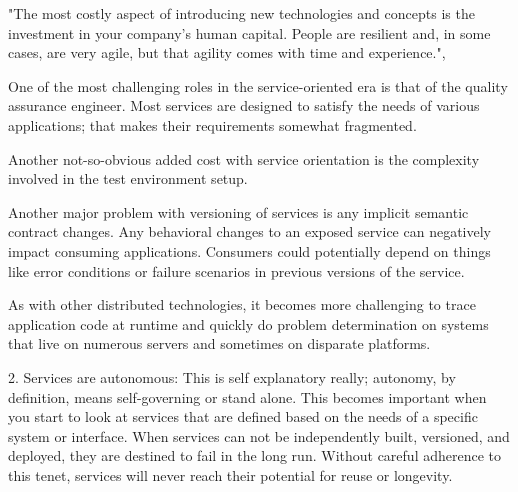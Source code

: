 \documentclass[12pt]{article}
\begin{document}
"The most costly aspect of introducing new technologies and concepts is the investment in your company’s human capital. People are resilient and, in some cases, are very agile, but that agility comes with time and experience.",\cite{pcsoa}

One of the most challenging roles in the service-oriented era is that of the quality assurance engineer. Most services are designed to satisfy the needs of various applications; that makes their requirements somewhat fragmented.

Another not-so-obvious added cost with service orientation is the complexity involved in the test environment setup.


Another major problem with versioning of services is any implicit semantic contract changes. Any behavioral changes to an exposed service can negatively impact consuming applications. 
Consumers could potentially depend on things like error conditions or failure scenarios in previous versions of the service. 


As with other distributed technologies, it becomes more challenging to trace application code at runtime and quickly do problem determination on systems that live on numerous servers and sometimes on disparate platforms.






2.      Services are autonomous: This is self explanatory really; autonomy, by definition, means self-governing or stand alone. This becomes important when you start to look at services that are defined based on the needs of a specific system or interface. When services can not be independently built, versioned, and deployed, they are destined to fail in the long run. Without careful adherence to this tenet, services will never reach their potential for reuse or longevity.
\end{document}
